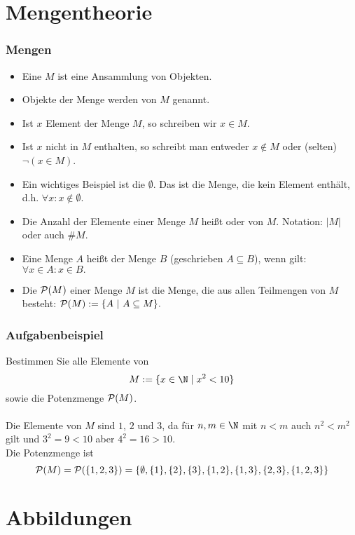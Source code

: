 \section{Mengentheorie}
%
\begin{frame}\frametitle{Mengen}

	\begin{itemize}
		\item Eine  $M$ ist eine Ansammlung von Objekten.
		\item Objekte der Menge werden  von $M$ genannt.
		\item Ist $x$ Element der Menge $M$, so schreiben wir 
			$
				x\in M.
			$
		\item Ist $x$ nicht in $M$ enthalten, so schreibt man entweder $x \notin M$ oder (selten) $\neg(x\in M)$. 
		\item Ein wichtiges Beispiel ist die  $\emptyset$. Das ist die Menge, die kein Element enthält, 
			d.h.
			$
				\forall x: x\notin \emptyset.
			$
		\item Die Anzahl der Elemente einer Menge $M$ hei{\ss}t  oder  von $M$.
			Notation: $|M|$ oder auch $\#M$.
		\item 	Eine Menge $A$ hei{\ss}t  der Menge $B$ (geschrieben $A \subseteq B$), wenn gilt:
	$
		\forall x\in A: x\in B.
	$
		\item Die  ${\cal P}(M)$ einer Menge $M$ ist die Menge, 
	die aus allen Teilmengen von $M$ besteht:
	$
		{\cal P}(M) := \{ A ~|~ A \subseteq M \}.
	$
	\end{itemize}

\end{frame}
%
%
\begin{frame}\frametitle{Aufgabenbeispiel}
Bestimmen Sie alle Elemente von 
$$
M:=\{x \in \N \mid x^2<10\}
$$
sowie die Potenzmenge ${\cal P}(M)$.\\\pause\vfill
{}\\
Die Elemente von $M$ sind $1$, $2$ und $3$, da für $n,m \in \N$ mit $n < m$ auch $n^2 < m^2$ gilt und $3^2=9<10$ aber $4^2=16>10$.\\
Die Potenzmenge ist 
$$
{\cal P}(M)={\cal P}(\{1,2,3\})=\{\emptyset,\{1\},\{2\},\{3\},\{1,2\},\{1,3\},\{2,3\},\{1,2,3\}\}
$$
\end{frame}
%
\section{Abbildungen}
%

